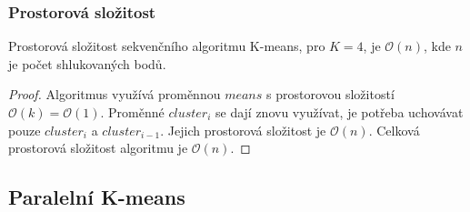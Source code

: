 \documentclass[a4paper, 11pt, fleqn]{scrartcl}
\begin{document}
      \subsubsection{Prostorová složitost}
        Prostorová složitost sekvenčního algoritmu K-means, pro $K = 4$, je $\mathcal{O}(n)$, kde $n$ je počet shlukovaných bodů.

        \begin{proof}
          Algoritmus využívá proměnnou $means$ s prostorovou složitostí $\mathcal{O}(k) = \mathcal{O}(1)$. Proměnné $cluster_i$ se dají znovu využívat, je potřeba uchovávat pouze $cluster_i$ a $cluster_{i-1}$. Jejich prostorová složitost je $\mathcal{O}(n)$. Celková prostorová složitost algoritmu je $\mathcal{O}(n)$.
        \end{proof}

    \subsection{Paralelní K-means}
\end{document}
